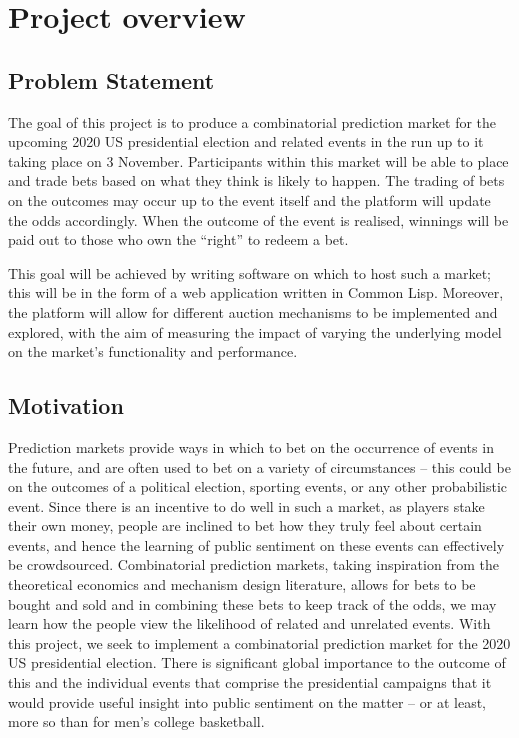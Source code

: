 \documentclass[10pt,a4paper]{article}
\theoremstyle{plain}
\theoremstyle{definition}
\begin{document}
\section{Project overview}
	\label{sec:overview}

	\subsection{Problem Statement}

	The goal of this project is to produce a combinatorial prediction market
	for the upcoming 2020 US presidential election and related events in the
	run up to it taking place on 3 November. Participants within this market
	will be able to place and trade bets based on what they think is likely to
	happen. The trading of bets on the outcomes may occur up to the event
	itself and the platform will update the odds accordingly. When the outcome
	of the event is realised, winnings will be paid out to those who own the
	``right'' to redeem a bet.

	This goal will be achieved by writing software on which to host such a
	market; this will be in the form of a web application written in Common
	Lisp. Moreover, the platform will allow for different auction mechanisms to
	be implemented and explored, with the aim of measuring the impact of
	varying the underlying model on the market's functionality and performance.

	\subsection{Motivation}

	Prediction markets provide ways in which to bet on the occurrence of events
	in the future, and are often used to bet on a variety of circumstances --
	this could be on the outcomes of a political election, sporting events, or
	any other probabilistic event. Since there is an incentive to do well in
	such a market, as players stake their own money, people are inclined to bet
	how they truly feel about certain events, and hence the learning of public
	sentiment on these events can effectively be crowdsourced. Combinatorial
	prediction markets, taking inspiration from the theoretical economics and
	mechanism design literature, allows for bets to be bought and sold and in
	combining these bets to keep track of the odds, we may learn how the people
	view the likelihood of related and unrelated events. With this project, we
	seek to implement a combinatorial prediction market for the 2020 US
	presidential election. There is significant global importance to the
	outcome of this and the individual events that comprise the presidential
	campaigns that it would provide useful insight into public sentiment on the
	matter -- or at least, more so than for men's college basketball.
\end{document}
